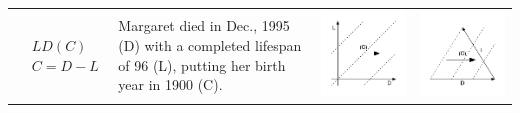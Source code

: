 \documentclass[11pt,oneside,a4paper]{article} %
\begin{document}
\begin{center}
\begin{longtable}{m{}m{}m{}m{}}
  \midrule
  $$\begin{aligned}
    &LD(C) \\
    &C = D - L
  \end{aligned}$$ &
  Margaret died in Dec., 1995 (D) with a completed lifespan of 96 (L), putting
  her birth year in 1900 (C). &
  \includegraphics[width = \linewidth]{Figures/JonasTable/LDc.pdf} & 
  \includegraphics[width = \linewidth]{Figures/JonasTable/LDc_iso.pdf}  \\

\end{longtable}
\end{center}
\end{document}
